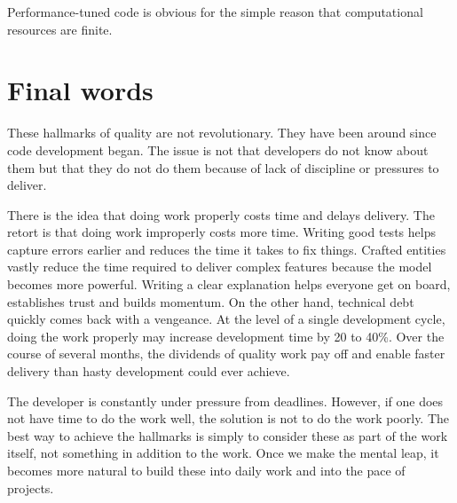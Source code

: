 \documentclass[10pt,openany,10pt]{book}
\begin{document}
Performance-tuned code is obvious for the simple reason that
computational resources are finite.

\section{Final words}\label{final-words}

These hallmarks of quality are not revolutionary. They have been around
since code development began. The issue is not that developers do not
know about them but that they do not do them because of lack of
discipline or pressures to deliver.

There is the idea that doing work properly costs time and delays
delivery. The retort is that doing work improperly costs more time.
Writing good tests helps capture errors earlier and reduces the time it
takes to fix things. Crafted entities vastly reduce the time required to
deliver complex features because the model becomes more powerful.
Writing a clear explanation helps everyone get on board, establishes
trust and builds momentum. On the other hand, technical debt quickly
comes back with a vengeance. At the level of a single development cycle,
doing the work properly may increase development time by 20 to 40\%.
Over the course of several months, the dividends of quality work pay off
and enable faster delivery than hasty development could ever achieve.

The developer is constantly under pressure from deadlines. However, if
one does not have time to do the work well, the solution is not to do
the work poorly. The best way to achieve the hallmarks is simply to
consider these as part of the work itself, not something in addition to
the work. Once we make the mental leap, it becomes more natural to build
these into daily work and into the pace of projects.
\end{document}
